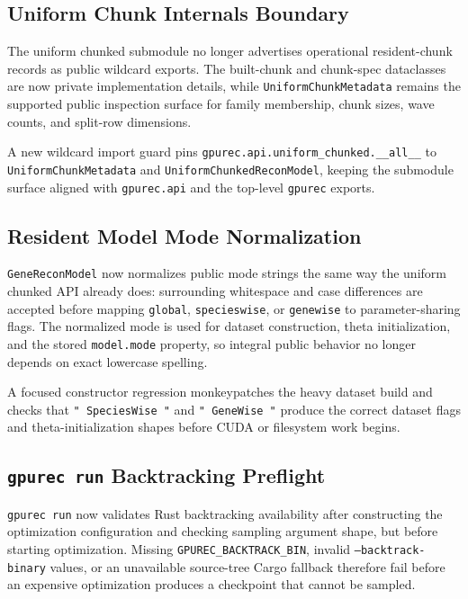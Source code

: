 \documentclass[11pt]{article}
\begin{document}
\subsection{Uniform Chunk Internals Boundary}

The uniform chunked submodule no longer advertises operational resident-chunk
records as public wildcard exports.  The built-chunk and chunk-spec dataclasses
are now private implementation details, while \texttt{UniformChunkMetadata}
remains the supported public inspection surface for family membership, chunk
sizes, wave counts, and split-row dimensions.

A new wildcard import guard pins
\texttt{gpurec.api.uniform\_chunked.\_\_all\_\_} to
\texttt{UniformChunkMetadata} and \texttt{UniformChunkedReconModel}, keeping the
submodule surface aligned with \texttt{gpurec.api} and the top-level
\texttt{gpurec} exports.

\subsection{Resident Model Mode Normalization}

\texttt{GeneReconModel} now normalizes public mode strings the same way the
uniform chunked API already does: surrounding whitespace and case differences
are accepted before mapping \texttt{global}, \texttt{specieswise}, or
\texttt{genewise} to parameter-sharing flags.  The normalized mode is used for
dataset construction, theta initialization, and the stored \texttt{model.mode}
property, so integral public behavior no longer depends on exact lowercase
spelling.

A focused constructor regression monkeypatches the heavy dataset build and
checks that \texttt{" SpeciesWise "} and \texttt{" GeneWise "} produce the
correct dataset flags and theta-initialization shapes before CUDA or filesystem
work begins.

\subsection{\texttt{gpurec run} Backtracking Preflight}

\texttt{gpurec run} now validates Rust backtracking availability after
constructing the optimization configuration and checking sampling argument
shape, but before starting optimization.  Missing
\texttt{GPUREC\_BACKTRACK\_BIN}, invalid \texttt{--backtrack-binary} values, or
an unavailable source-tree Cargo fallback therefore fail before an expensive
optimization produces a checkpoint that cannot be sampled.
\end{document}

